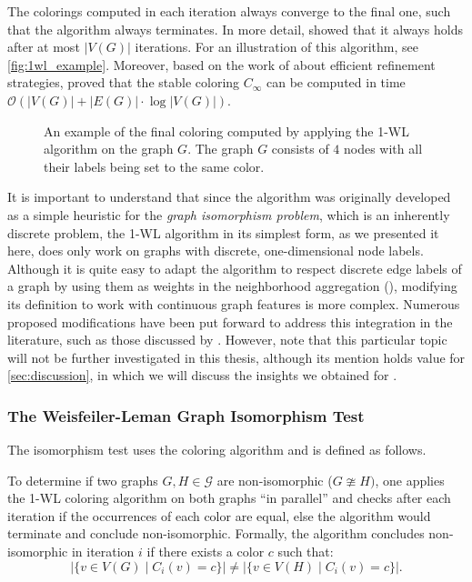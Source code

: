 The colorings computed in each iteration always converge to the final one, such that the algorithm always terminates. In more detail, \cite{Gro2017} showed that it always holds after at most $|V(G)|$ iterations. For an illustration of this algorithm, see \autoref{fig:1wl_example}. Moreover, based on the work of \cite{Pai+87} about efficient refinement strategies, \cite{Car+82} proved that the stable coloring $C_\infty$ can be computed in time $\mathcal{O}(| V(G) | + |E(G)| \cdot \log | V(G) |)$.

\begin{figure}[H]
    \centering
    
    \caption{An example of the final coloring computed by applying the 1-WL algorithm on the graph $G$. The graph $G$ consists of $4$ nodes with all their labels being set to the same color.}
    \label{fig:1wl_example}
\end{figure}

It is important to understand that since the algorithm was originally developed as a simple heuristic for the \textit{graph isomorphism problem}, which is an inherently discrete problem, the 1-WL algorithm in its simplest form, as we presented it here, does only work on graphs with discrete, one-dimensional node labels. Although it is quite easy to adapt the algorithm to respect discrete edge labels of a graph by using them as weights in the neighborhood aggregation (\cite{Shervashidze2011}), modifying its definition to work with continuous graph features is more complex. Numerous proposed modifications have been put forward to address this integration in the literature, such as those discussed by \cite{Mor+2016}. However, note that this particular topic will not be further investigated in this thesis, although its mention holds value for \cref{sec:discussion}, in which we will discuss the insights we obtained for \gnns.

\subsubsection{The Weisfeiler-Leman Graph Isomorphism Test}
The isomorphism test uses the \wl coloring algorithm and is defined as follows.

\begin{definition}
    To determine if two graphs $G, H \in \mathcal{G}$ are non-isomorphic ($G \ncong H)$, one applies the 1-WL coloring algorithm on both graphs ``in parallel'' and checks after each iteration if the occurrences of each color are equal, else the algorithm would terminate and conclude non-isomorphic. Formally, the algorithm concludes non-isomorphic in iteration $i$ if there exists a color $c$ such that: 
    \begin{equation*}
        |\{ v \in V(G) \mid C_i(v) = c\} | \neq |\{ v \in V(H) \mid C_i(v) = c\} |.
    \end{equation*}
\end{definition}

